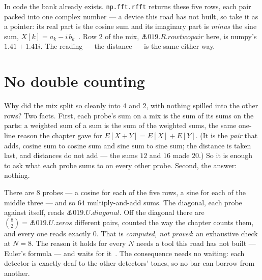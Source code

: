 \begin{narrative}
In code the bank already exists. \texttt{np.fft.rfft} returns these
five rows, each pair packed into one complex number — a device this
road has not built, so take it as a pointer: its real part is the
cosine sum and its imaginary part is \emph{minus} the sine sum,
$X[k] = a_k - i\,b_k$~\cite{signal_processing-j-o-smith-mathematics-of-the-dft-the-dft}.
Row $2$ of the mix, $\anchor{019.R.rowtwopair}$ here, is numpy's
$1.41 + 1.41i$. The reading — the distance — is the same either way.

\section{No double counting}

Why did the mix split so cleanly into $4$ and $2$, with nothing spilled
into the other rows? Two facts. First, each probe's sum on a mix is the
sum of its sums on the parts: a weighted sum of a sum is the sum of the
weighted sums, the same one-line reason the 
chapter gave for $E[X + Y] = E[X] + E[Y]$. (It is the \emph{pair} that
adds, cosine sum to cosine sum and sine sum to sine sum; the distance is
taken last, and distances do not add — the sums $12$ and $16$ made
$20$.) So it is enough to ask what each probe sums to on every other
probe. Second, the answer: nothing.

\begin{center}
\end{center}

There are $8$ probes — a cosine for each of the five rows, a sine for
each of the middle three — and so $64$ multiply-and-add sums. The
diagonal, each probe against itself, reads
$\anchor{019.U.diagonal}$. Off the diagonal there are
$\binom{8}{2} = \anchor{019.U.zeros}$ different pairs, counted the way
the  chapter counts them, and every one reads exactly $0$.
That is \emph{computed, not proved}: an exhaustive check at $N = 8$. The
reason it holds for every $N$ needs a tool this road has not built —
Euler's formula — and waits for
it~\cite{signal_processing-j-o-smith-mdft-orthogonality-of-the-dft-sinusoids}.
The consequence needs no waiting: each detector is exactly deaf to the
other detectors' tones, so no bar can borrow from another.


\end{narrative}
